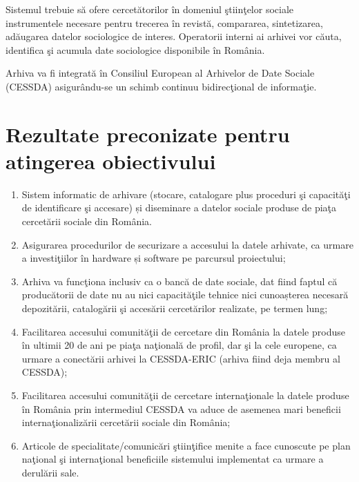 \documentclass[a4paper, 10pt]{article}
\begin{document}
{\medskip

Sistemul trebuie s\u{a} ofere cercet\u{a}torilor \^in domeniul \c{s}tiin\c{t}elor sociale instrumentele necesare pentru
trecerea \^in revist\u{a}, compararea, sintetizarea, ad\u{a}ugarea datelor sociologice de interes. 
Operatorii interni ai arhivei vor c\u{a}uta, 
identifica \c{s}i acumula date sociologice disponibile \^in Rom\^ania.

\medskip

Arhiva va fi integrat\u{a} \^in Consiliul European al Arhivelor de Date Sociale (CESSDA) asigur\^andu-se un schimb
continuu bidirec\c{t}ional de informa\c{t}ie.

\section{Rezultate preconizate pentru atingerea obiectivului}

\begin{enumerate}
\item {
Sistem informatic de arhivare (stocare, catalogare plus proceduri \c{s}i capacit\u{a}\c{t}i de identificare \c{s}i
accesare) \foreignlanguage{romanian}{\c{s}}i diseminare a datelor sociale produse de pia\c{t}a cercet\u{a}rii sociale
din Rom\^ania.}
\item {
Asigurarea procedurilor de securizare a accesului la datele arhivate, ca urmare a investi\c{t}iilor \^in hardware
\foreignlanguage{romanian}{\c{s}}i software pe parcursul proiectului;}
\item {
\foreignlanguage{romanian}{Arhiva }va func\c{t}iona inclusiv ca o banc\u{a} de date sociale, dat fiind faptul c\u{a}
produc\u{a}torii de date nu au nici capacit\u{a}\c{t}ile tehnice nici \foreignlanguage{romanian}{cunoa\c{s}terea}
necesar\u{a} depozit\u{a}rii, catalog\u{a}rii \c{s}i acces\u{a}rii cercet\u{a}rilor realizate, pe termen lung;}
\item {
Facilitarea accesului comunit\u{a}\c{t}ii de cercetare din Rom\^ania la datele produse \^in ultimii 20 de ani pe
pia\c{t}a na\c{t}ional\u{a} de profil, dar \c{s}i la cele europene, ca urmare a conect\u{a}rii arhivei la CESSDA-ERIC
(arhiva fiind deja membru al CESSDA);}
\item {
Facilitarea accesului comunit\u{a}\c{t}ii de cercetare interna\c{t}ionale la datele produse \^in Rom\^ania prin
intermediul CESSDA va aduce de asemenea mari beneficii interna\c{t}ionaliz\u{a}rii cercet\u{a}rii sociale din
Rom\^ania;}
\item {
Articole de specialitate/comunic\u{a}ri \c{s}tiin\c{t}ifice menite a face cunoscute pe plan na\c{t}ional \c{s}i
interna\c{t}ional beneficiile sistemului implementat ca urmare a derul\u{a}rii sale.}
\end{enumerate}

}
\end{document}
